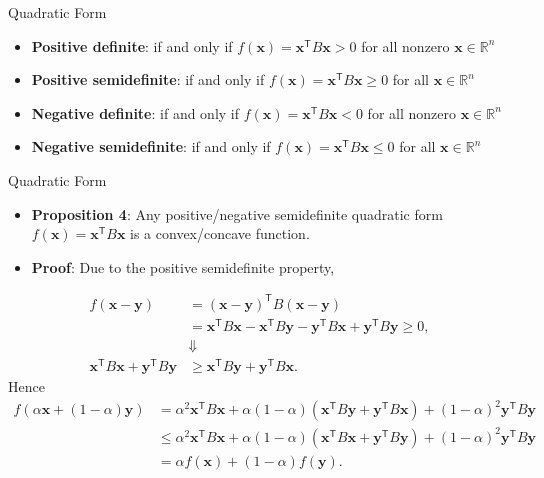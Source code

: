 \documentclass[aspectratio=169,hyperref,UTF8,CJK]{beamer}
\newcommand{\R}{\mathbb{R}}
\newcommand{\trans}{\mathsf{T}}
\newcommand{\vect}[1]{\boldsymbol{#1}}
\begin{document}
\begin{frame}{Quadratic Form}
  \small
  \begin{itemize}
    \item \textbf{Positive definite}: if and only if $f(\vect{x})=\vect{x}^{\trans}B\vect{x}>0$ for all nonzero $\vect{x}\in\R^n$
    \item \textbf{Positive semidefinite}: if and only if $f(\vect{x})=\vect{x}^{\trans}B\vect{x}\ge0$ for all $\vect{x}\in\R^n$
    \item \textbf{Negative definite}: if and only if $f(\vect{x})=\vect{x}^{\trans}B\vect{x}<0$ for all nonzero $\vect{x}\in\R^n$
    \item \textbf{Negative semidefinite}: if and only if $f(\vect{x})=\vect{x}^{\trans}B\vect{x}\le0$ for all $\vect{x}\in\R^n$
  \end{itemize}
\end{frame}

\begin{frame}{Quadratic Form}
  \scriptsize
  \begin{itemize}
    \item \textbf{Proposition 4}: Any positive/negative semidefinite quadratic form $f(\vect{x})=\vect{x}^{\trans}B\vect{x}$ is a convex/concave function.
    \item \textbf{Proof}: Due to the positive semidefinite property,
  \end{itemize}
  \begin{align*}
    f(\vect{x}-\vect{y})
      &=(\vect{x}-\vect{y})^{\trans}B(\vect{x}-\vect{y})\\
      &=\vect{x}^{\trans}B\vect{x}-\vect{x}^{\trans}B\vect{y}
        -\vect{y}^{\trans}B\vect{x}+\vect{y}^{\trans}B\vect{y}\ge0,\\[-1mm]
    &\Downarrow\\[-1mm]
    \vect{x}^{\trans}B\vect{x}+\vect{y}^{\trans}B\vect{y}
      &\ge\vect{x}^{\trans}B\vect{y}+\vect{y}^{\trans}B\vect{x}.
  \end{align*}
  Hence
  \begin{align*}
    f(\alpha\vect{x}+(1-\alpha)\vect{y})
      &=\alpha^2\vect{x}^{\trans}B\vect{x}
        +\alpha(1-\alpha)(\vect{x}^{\trans}B\vect{y}+\vect{y}^{\trans}B\vect{x})
        +(1-\alpha)^2\vect{y}^{\trans}B\vect{y}\\
      &\le\alpha^2\vect{x}^{\trans}B\vect{x}
        +\alpha(1-\alpha)(\vect{x}^{\trans}B\vect{x}+\vect{y}^{\trans}B\vect{y})
        +(1-\alpha)^2\vect{y}^{\trans}B\vect{y}\\
      &=\alpha f(\vect{x})+(1-\alpha)f(\vect{y}).
  \end{align*}
\end{frame}
\end{document}
